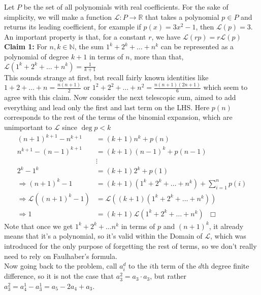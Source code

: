 \begin{solution}
    Let $P$ be the set of all polynomials with real coefficients. For the sake of simplicity, we will make a function $\mathcal{L}: P \rightarrow \mathbb{R}$ that takes a polynomial $p \in P$ and returns its leading coefficient, for example if $p(x) = 3x^2-1$, then  $\mathcal{L}(p)=3$. An important property is that, for a constant $r$, we have $\mathcal{L}(rp) = r \mathcal{L}(p)$  \\[2mm]
    \textbf{Claim 1:} For $n,k \in \mathbb{N}$, the sum $1^k + 2^k + \ldots + n^k$ can be represented as a polynomial of degree $k+1$ in terms of $n$, more than that, $\mathcal{L}(1^k + 2^k + \ldots + n^k) = \frac{1}{k+1}$ \\[3mm]
    This sounds strange at first, but recall fairly known identities like $1 + 2 + \ldots + n = \frac{n(n+1)}{2}$ or $1^2+2^2 + \ldots + n^2 = \frac{n(n+1)(2n+1)}{6}$ which seem to agree with this claim. Now consider the next telescopic sum, aimed to add everything and lead only the first and last term on the LHS. Here $p(n)$ corresponds to the rest of the terms of the binomial expansion, which are unimportant to $\mathcal{L}$ since $\deg p < k$
    \begin{align*}
        (n+1)^{k+1} - n^{k+1} &= (k+1)n^k + p(n) \\
        n^{k+1} - (n-1)^{k+1} &= (k+1)(n-1)^k + p(n-1) \\
        &\vdots \\
        2^k - 1^k &= (k+1)2^k + p(1) \\
        \Rightarrow (n+1)^k - 1 &= (k+1)(1^k+2^k+ \ldots + n^k) + \sum_{i=1}^n p(i) \\
        \Rightarrow \mathcal{L}((n+1)^k-1) &= \mathcal{L}((k+1)(1^k+2^k + \ldots+n^k)) \\
        \Rightarrow1 &= (k+1) \mathcal{L}(1^k + 2^k + \ldots + n^k) \hspace{7pt}\Box
    \end{align*}
    Note that once we get $1^k + 2^k + \ldots n^k$ in terms of $p$ and $(n+1)^k$, it already means that it's a polynomial, so it's valid within the Domain of $\mathcal{L}$, which was introduced for the only purpose of forgetting the rest of terms, so we don't really need to rely on Faulhaber's formula. \\[2mm]
    Now going back to the problem, call $a_i^d$ to the $i$th term of the $d$th degree finite difference, so it is not the case that $a^2_3 = a_3 \cdot a_3$, but rather $a^2_3 = a_4^1 - a_3^1 = a_5 - 2a_4 + a_3$. \newpage

\end{solution}
